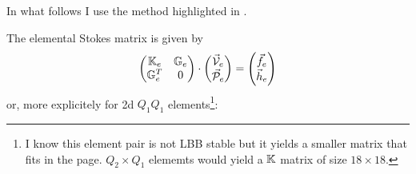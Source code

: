 In what follows I use the method highlighted in \textcite{ensg82}.

The elemental Stokes matrix is given by
\begin{equation}
\begin{pmatrix}
{\mathbb{K}}_e & {\mathbb{G}}_e \\
{\mathbb{G}}_e^T & 0 
\end{pmatrix}
\cdot
\begin{pmatrix}
\vec{\cal V}_e \\ \vec{\cal P}_e
\end{pmatrix}
=
\begin{pmatrix}
\vec{f}_e \\ \vec{h}_{e}
\end{pmatrix}
\label{bcfs1}
\end{equation}
or, more explicitely for 2d $Q_1 Q_1$ elements\footnote{I know this element pair is not LBB stable but 
it yields a smaller matrix that fits in the page. $Q_2\times Q_1$ elememts would yield a ${\mathbb{K}}$ matrix of size $18\times 18$.}:
